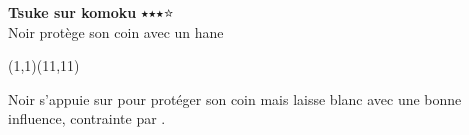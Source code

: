 \documentclass[preview, border=0pt, varwidth=false]{standalone}
\begin{document}
	\setgounit{0.6cm} 
	
\parbox[c][14.65cm][c]{10.2cm}{
	\centering
	
	{\Large\textbf{Tsuke sur komoku} 	$\medblackstar \medblackstar \medblackstar \medwhitestar$ \\ Noir protège son coin avec un hane}
	\vspace{3em}
	
	\begin{psgopartialboard}{(1,1)(11,11)}
		\pass
	\end{psgopartialboard}
	
	\vspace{1em}
	Noir s'appuie sur  pour protéger son coin mais laisse blanc avec une bonne influence, contrainte par .}
\end{document}
